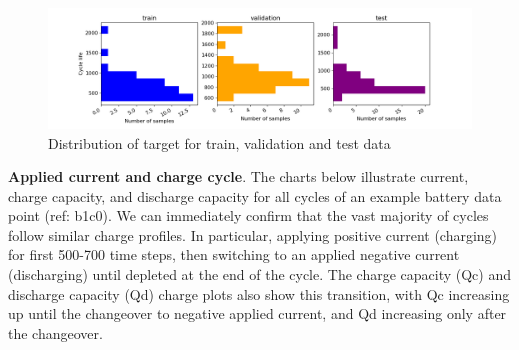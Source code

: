 \documentclass{article}
\begin{document}
    \begin{figure}[H]
        \centering
        \includegraphics[scale=0.5] {figs/histogram_cycle_life_traintest.png}
        \caption{Distribution of target for train, validation and test data}
        \label{fig:1b}
    \end{figure}

\textbf{Applied current and charge cycle}. The charts below illustrate current, charge capacity, and  discharge capacity for all cycles of an example battery data point (ref: b1c0). We can immediately confirm that the vast majority of cycles follow similar charge profiles. In particular, applying positive current (charging) for first 500-700 time steps, then switching to an applied negative current (discharging) until depleted at the end of the cycle. The charge capacity (Qc) and discharge capacity (Qd) charge plots also show this transition, with Qc increasing up until the changeover to negative applied current, and Qd increasing only after the changeover.
\end{document}

